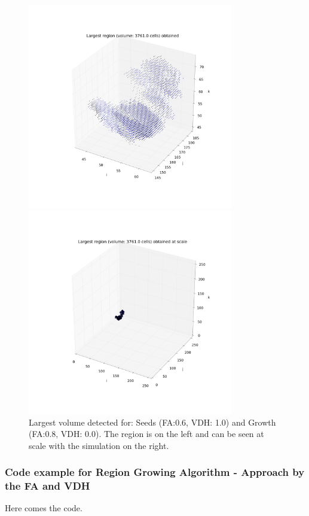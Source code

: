\documentclass[12pt]{article}
\begin{document}
\begin{figure}[ht]
\centering
\begin{minipage}{.5\textwidth}
  \centering
  \includegraphics[width=0.8\textwidth]{groups/firstimplementation/largest_vol_24_seeds_129.png} %
\end{minipage}%
\begin{minipage}{.5\textwidth}
  \centering
  \includegraphics[width=0.8\textwidth]{groups/firstimplementation/largest_vol_24_seeds_129_scale.png}
  \end{minipage}
\caption{Largest volume detected for: Seeds (FA:0.6, VDH: 1.0) and Growth (FA:0.8, VDH: 0.0). The region is on the left and can be seen at scale with the simulation on the right.}
\label{fg:first_3D_largest}
\end{figure}
\FloatBarrier
\subsubsection{Code example for Region Growing Algorithm - Approach by the FA and VDH}
\label{App:own_impl_code}
\tiny
Here comes the code.
\end{document}
